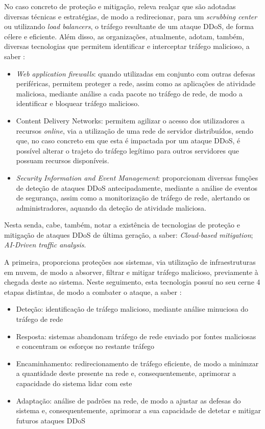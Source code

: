 No caso concreto de proteção e mitigação, releva realçar que são adotadas diversas técnicas e estratégias, de modo a redirecionar, para um \textit{scrubbing center} ou utilizando \textit{load balancers}, o tráfego resultante de um ataque DDoS, de forma célere e eficiente. Além disso, as organizações, atualmente, adotam, também, diversas tecnologias que permitem identificar e interceptar tráfego malicioso, a saber \cite{ibm_what_is_ddos}:
\begin{itemize}
    \item \textit{Web application firewalls}: quando utilizadas em conjunto com outras defesas periféricas, permitem proteger a rede, assim como as aplicações de atividade maliciosa, mediante análise a cada pacote no tráfego de rede, de modo a identificar e bloquear tráfego malicioso.
    \item Content Delivery Networks: permitem agilizar o acesso dos utilizadores a recursos \textit{online}, via a utilização de uma rede de servidor distribuídos, sendo que, no caso concreto em que esta é impactada por um ataque DDoS, é possível alterar o trajeto do tráfego legítimo para outros servidores que possuam recursos disponíveis.
    \item \textit{Security Information and Event Management}: proporcionam diversas funções de deteção de ataques DDoS antecipadamente, mediante a análise de eventos de segurança, assim como a monitorização de tráfego de rede, alertando os administradores, aquando da deteção de atividade maliciosa.
\end{itemize}

Nesta senda, cabe, também, notar a existência de tecnologias de proteção e mitigação de ataques DDoS de última geração, a saber: \textit{Cloud-based mitigation}; \textit{AI-Driven traffic analysis}.


A primeira, proporciona proteções aos sistemas, via utilização de infraestruturas em nuvem, de modo a absorver, filtrar e mitigar tráfego malicioso, previamente à chegada deste ao sistema. Neste seguimento, esta tecnologia possuí no seu cerne 4 etapas distintas, de modo a combater o ataque, a saber \cite{cloudflare_cloud_based_protection}:
\begin{itemize}
    \item Deteção: identificação de tráfego malicioso, mediante análise minuciosa do tráfego de rede
    \item Resposta: sistemas abandonam tráfego de rede enviado por fontes maliciosas e concentram os esforços no restante tráfego
    \item Encaminhamento: redirecionamento de tráfego eficiente, de modo a minimzar a quantidade deste presente na rede e, consequentemente, aprimorar a capacidade do sistema lidar com este
    \item Adaptação: análise de padrões na rede, de modo a ajustar as defesas do sistema e, consequentemente, aprimorar a sua capacidade de detetar e mitigar futuros ataques DDoS
\end{itemize}

